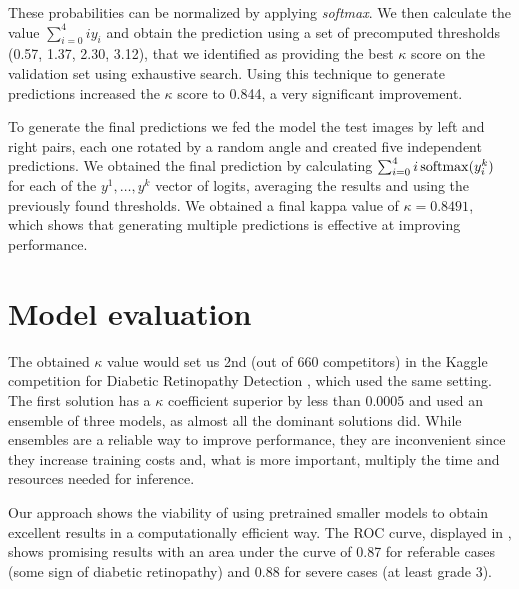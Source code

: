 These probabilities can be normalized by applying \textit{softmax}. We then calculate the value \( \sum_{i = 0}^4 i y_i \) and obtain the prediction using a set of precomputed thresholds (0.57, 1.37, 2.30, 3.12), that we identified as providing the best \( \kappa \) score on the validation set using exhaustive search. Using this technique to generate predictions increased the \( \kappa \) score to 0.844, a very significant improvement.

To generate the final predictions we fed the model the test images by left and right pairs, each one rotated by a random angle and created five independent predictions. We obtained the final prediction by calculating \( \sum_{i = 0}^4 i \operatorname{softmax}(y_i^k) \) for each of the \( y^1, \dots, y^k \) vector of logits, averaging the results and using the previously found thresholds. We obtained a final kappa value of \( \kappa = 0.8491 \), which shows that generating multiple predictions is effective at improving performance.

\section{Model evaluation}
The obtained \( \kappa \) value would set us 2nd (out of 660 competitors) in the Kaggle competition for Diabetic Retinopathy Detection \cite{diabeticretinopathydetection}, which used the same setting. The first solution has a \( \kappa \) coefficient superior by less than \( 0.0005 \) and used an ensemble of three models, as almost all the dominant solutions did. While ensembles are a reliable way to improve performance, they are inconvenient since they increase training costs and, what is more important, multiply the time and resources needed for inference.

Our approach shows the viability of using pretrained smaller models to obtain excellent results in a computationally efficient way. The ROC curve, displayed in , shows promising results with an area under the curve of 0.87 for referable cases (some sign of diabetic retinopathy) and 0.88 for severe cases (at least grade 3). 

